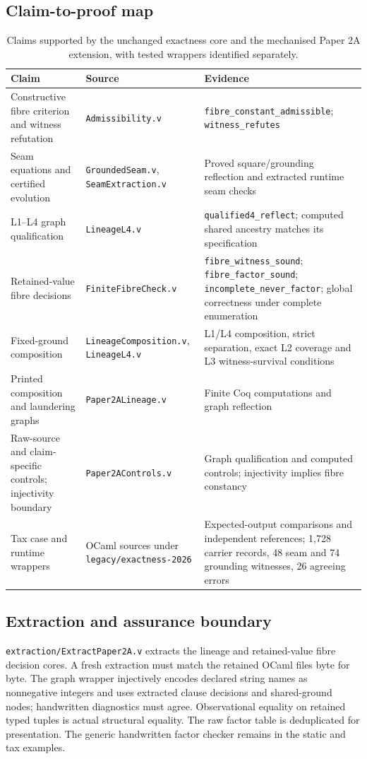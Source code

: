\documentclass[smallextended,envcountsect,envcountsame,natbib]{svjour3}
\newcommand{\code}[1]{\texttt{#1}}
\begin{document}
\subsection{Claim-to-proof map}
\begin{table}[htbp]
\centering\scriptsize
\caption{Claims supported by the unchanged exactness core and the mechanised Paper 2A extension, with tested wrappers identified separately.}\label{ex:tab:verification-map}
\begin{tabularx}{\textwidth}{@{}p{3.8cm}p{3.2cm}L@{}}
\toprule
Claim & Source & Evidence \\
\midrule
Constructive fibre criterion and witness refutation & \code{Admissibility.v} & \code{fibre\_constant\_admissible}; \code{witness\_refutes} \\
Seam equations and certified evolution & \code{GroundedSeam.v}, \code{SeamExtraction.v} & Proved square/grounding reflection and extracted runtime seam checks \\
L1--L4 graph qualification & \code{LineageL4.v} & \code{qualified4\_reflect}; computed shared ancestry matches its specification \\
Retained-value fibre decisions & \code{FiniteFibreCheck.v} & \code{fibre\_witness\_sound}; \code{fibre\_factor\_sound}; \code{incomplete\_never\_factor}; global correctness under complete enumeration \\
Fixed-ground composition & \code{LineageComposition.v}, \code{LineageL4.v} & L1/L4 composition, strict separation, exact L2 coverage and L3 witness-survival conditions \\
Printed composition and laundering graphs & \code{Paper2ALineage.v} & Finite Coq computations and graph reflection \\
Raw-source and claim-specific controls; injectivity boundary & \code{Paper2AControls.v} & Graph qualification and computed controls; injectivity implies fibre constancy \\
Tax case and runtime wrappers & OCaml sources under \nolinkurl{legacy/exactness-2026} & Expected-output comparisons and independent references; 1,728 carrier records, 48 seam and 74 grounding witnesses, 26 agreeing errors \\
\bottomrule
\end{tabularx}
\end{table}
\FloatBarrier

\subsection{Extraction and assurance boundary}
\nolinkurl{extraction/ExtractPaper2A.v} extracts the lineage and retained-value fibre decision cores. A fresh extraction must match the retained OCaml files byte for byte. The graph wrapper injectively encodes declared string names as nonnegative integers and uses extracted clause decisions and shared-ground nodes; handwritten diagnostics must agree. Observational equality on retained typed tuples is actual structural equality. The raw factor table is deduplicated for presentation. The generic handwritten factor checker remains in the static and tax examples.
\end{document}
